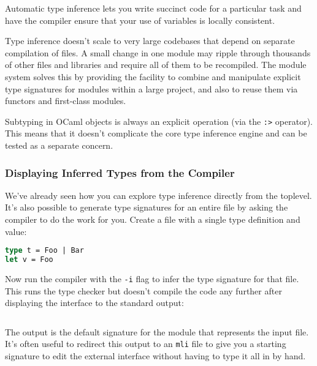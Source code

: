 Automatic type inference lets you write succinct code for a particular
task and have the compiler ensure that your use of variables is locally
consistent.

Type inference doesn't scale to very large codebases that depend on
separate compilation of files. A small change in one module may ripple
through thousands of other files and libraries and require all of them
to be recompiled. The module system solves this by providing the
facility to combine and manipulate explicit type signatures for modules
within a large project, and also to reuse them via functors and
first-class
modules.

Subtyping in OCaml objects is always an explicit operation (via the
\passthrough{\lstinline!:>!} operator). This means that it doesn't
complicate the core type inference engine and can be tested as a
separate concern.

\hypertarget{displaying-inferred-types-from-the-compiler}{%
\subsubsection{Displaying Inferred Types from the
Compiler}\label{displaying-inferred-types-from-the-compiler}}

We've already seen how you can explore type inference directly from the
toplevel. It's also possible to generate type signatures for an entire
file by asking the compiler to do the work for you. Create a file with a
single type definition and value:

\begin{lstlisting}[language=Caml]
type t = Foo | Bar
let v = Foo
\end{lstlisting}

Now run the compiler with the \passthrough{\lstinline!-i!} flag to infer
the type signature for that file. This runs the type checker but doesn't
compile the code any further after displaying the interface to the
standard output:

\begin{lstlisting}[language=bash]
\end{lstlisting}

The output is the default signature for the module that represents the
input file. It's often useful to redirect this output to an
\passthrough{\lstinline!mli!} file to give you a starting signature to
edit the external interface without having to type it all in by hand.

